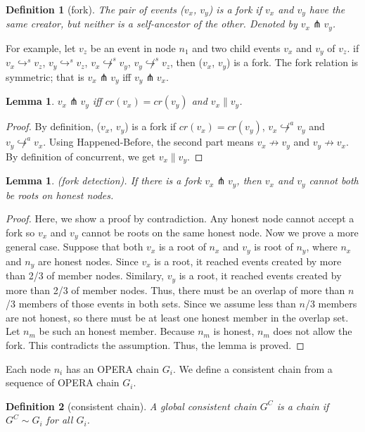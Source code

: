 \documentclass{article}
\newtheorem{lem}[thm]{Lemma}
\newtheorem{defn}{Definition}[section]
\newcommand{\eself}{\hookrightarrow^{s}}
\newcommand{\eancestor}{\hookrightarrow^{a}}
\newcommand{\efork}{\pitchfork}
\newcommand{\concur}{\parallel}
\begin{document}
\begin{defn}[fork]
	The pair of events ($v_x$, $v_y$) is a fork if $v_x$ and $v_y$ have the same creator, but neither is a self-ancestor of the other. Denoted by $v_x \efork v_y$.
\end{defn}
For example, let $v_z$ be an event in node $n_1$ and two child events $v_x$ and $v_y$ of $v_z$. if $v_x \eself v_z$, $v_y \eself v_z$, $v_x \not \eself v_y$, $v_y \not \eself v_z$, then ($v_x$, $v_y$) is a fork.
The fork relation is symmetric; that is $v_x \efork v_y$ iff $v_y \efork v_x$.
\begin{lem}
	$v_x \efork v_y$ iff $cr(v_x)=cr(v_y)$ and $v_x \concur v_y$.
\end{lem}
\begin{proof}
By definition, ($v_x$, $v_y$) is a fork if $cr(v_x)=cr(v_y)$, $v_x \not \eancestor v_y$ and $v_y \not \eancestor v_x$. Using Happened-Before, the second part means $v_x \not \rightarrow v_y$ and $v_y \not \rightarrow v_x$. By definition of concurrent, we get $v_x \concur v_y$.
\end{proof}


\begin{lem} (fork detection). If there is a fork $v_x \efork  v_y$, then $v_x$ and $v_y$ cannot both be roots on honest nodes.
\end{lem}
\begin{proof}
	Here, we show a proof by contradiction. Any honest node cannot accept a fork so $v_x$ and $v_y$ cannot be roots on the same honest node. Now we prove a more general case. Suppose that both $v_x$ is a root of $n_x$ and $v_y$ is root of $n_y$, where $n_x$ and $n_y$ are honest nodes. Since $v_x$ is a root, it reached events created by more than 2/3 of member nodes. Similary, $v_y$ is a root, it reached events created by  more than 2/3 of member nodes. Thus, there must be an overlap of more than $n$/3 members of those events in both sets. Since we assume less than $n$/3 members are not honest, so there must be at least one honest member in the overlap set. Let $n_m$ be such an honest member. Because $n_m$ is honest, $n_m$ does not allow the fork. This contradicts the assumption. Thus, the lemma is proved.
\end{proof}



Each node $n_i$ has an OPERA chain $G_i$. We define a consistent chain from a sequence of OPERA chain $G_i$.
\begin{defn}[consistent chain] 
	A global consistent chain $G^C$ is a chain if $G^C \sim G_i$ for all $G_i$.
\end{defn}
\end{document}
